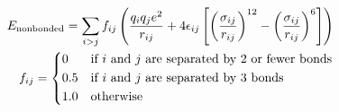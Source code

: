 \begin{equation}
\begin{split}
E_\mathrm{nonbonded} = \sum_{i>j} f_{ij} 
                \left (
                        \frac {q_i q_j e^2}{r_{ij}}
                    + 4 \epsilon_{ij} 
                    \left  [  
                        \left ( \frac{\sigma_{ij}}{r_{ij}}\right )^{12}
                      - \left ( \frac{\sigma_{ij}}{r_{ij}}\right )^{6}
                    \right ]
                \right )
\\
f_{ij} = 
  \begin{dcases*}
   0    & if $i$ and $j$ are separated by 2 or fewer bonds\\
   0.5  & if $i$ and $j$ are separated by 3 bonds\\
   1.0  & otherwise
  \end{dcases*}
\end{split}
\label{equation:nonbonded}
\end{equation}
